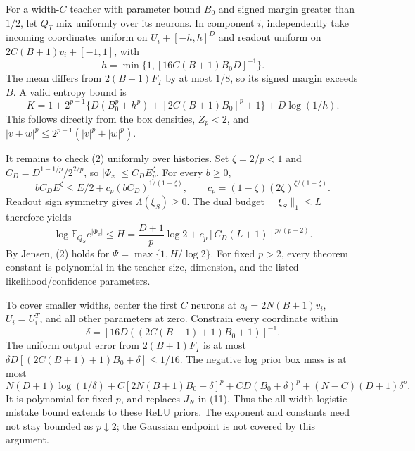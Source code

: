 \documentclass[11pt]{article}
\newcommand{\E}{\mathbb E}
\begin{document}
For a width-$C$ teacher with parameter bound $B_0$ and signed margin
greater than $1/2$, let $Q_T$ mix uniformly over its neurons. In component
$i$, independently take incoming coordinates uniform on
$U_i+[-h,h]^D$ and readout uniform on
$2C(B+1)v_i+[-1,1]$, with
\[
 h=\min\{1,[16C(B+1)B_0D]^{-1}\}.
\]
The mean differs from $2(B+1)F_T$ by at most $1/8$, so its signed
margin exceeds $B$. A valid entropy bound is
\[
 K=1+2^{p-1}\{D(B_0^p+h^p)+[2C(B+1)B_0]^p+1\}
                         +D\log(1/h).
\]
This follows directly from the box densities, $Z_p<2$, and
$|v+w|^p\le2^{p-1}(|v|^p+|w|^p)$.

It remains to check (2) uniformly over histories. Set
$\zeta=2/p<1$ and $C_D=D^{1-1/p}/2^{2/p}$, so
$|\Phi_x|\le C_DE_p^\zeta$. For every $b\ge0$,
\[
 bC_DE^\zeta\le E/2+
 c_p(bC_D)^{1/(1-\zeta)},\qquad
 c_p=(1-\zeta)(2\zeta)^{\zeta/(1-\zeta)}.
\]
Readout sign symmetry gives $\Lambda(\xi_S)\ge0$. The dual budget
$\|\xi_S\|_1\le L$ therefore yields
\[
 \log\E_{Q_S}e^{|\Phi_x|}
 \le H=\frac{D+1}{p}\log2+c_p[C_D(L+1)]^{p/(p-2)}.
\]
By Jensen, (2) holds for $\Psi=\max\{1,H/\log2\}$.
For fixed $p>2$, every theorem constant is polynomial in the teacher
size, dimension, and the listed likelihood/confidence parameters.

To cover smaller widths, center the first $C$ neurons at
$a_i=2N(B+1)v_i$, $U_i=U_i^T$, and all other parameters at zero.
Constrain every coordinate within
\[
 \delta=[16D((2C(B+1)+1)B_0+1)]^{-1}.
\]
The uniform output error from $2(B+1)F_T$ is at most
$\delta D[(2C(B+1)+1)B_0+\delta]\le1/16$.
The negative log prior box mass is at most
\[
 N(D+1)\log(1/\delta)+C[2N(B+1)B_0+\delta]^p
       +CD(B_0+\delta)^p+(N-C)(D+1)\delta^p.
\]
It is polynomial for fixed $p$, and replaces $J_N$ in (11).
Thus the all-width logistic mistake bound extends to these ReLU priors.
The exponent and constants need not stay bounded as $p\downarrow2$;
the Gaussian endpoint is not covered by this argument.
\end{document}
